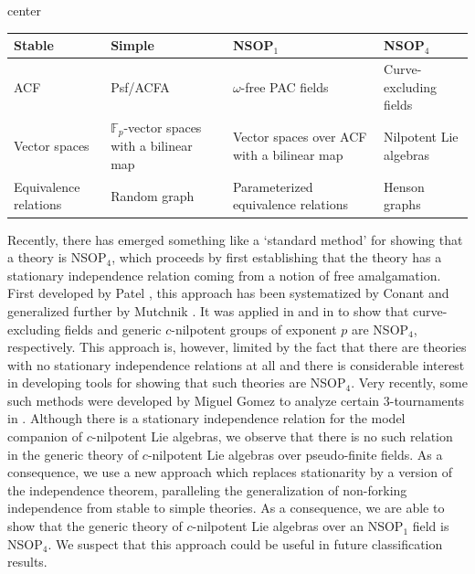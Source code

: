 \documentclass[psamsfonts]{amsart}
\theoremstyle{definition}
\theoremstyle{definition}
\theoremstyle{remark}
\numberwithin{equation}{section}
\begin{document}
\small{
\begin{table}[htbp]
  \centering
  \label{tab:my-table}
  \begin{adjustbox}{center}
  \begin{tabularx}{\textwidth}{|X|X|X|X|}
  \hline
    Stable & Simple & NSOP$_{1}$ & NSOP$_{4}$ \\
    \hline
    ACF & Psf/ACFA & $\omega$-free PAC fields & Curve-excluding fields \\
    \hline
     Vector spaces & $\mathbb{F}_{p}$-vector spaces with a bilinear map & Vector spaces over ACF with a bilinear map & Nilpotent Lie algebras \\
    \hline 
    Equivalence relations & Random graph & Parameterized equivalence relations & Henson graphs  \\
    \hline 
  \end{tabularx}
  \end{adjustbox}
\end{table}
}
\normalsize
\noindent Recently, there has emerged something like a `standard method' for showing that a theory is NSOP$_{4}$, which proceeds by first establishing that the theory has a stationary independence relation coming from a notion of free amalgamation.  First developed by Patel \cite{patel2006family}, this approach has been systematized by Conant \cite{conant2017axiomatic} and generalized further by Mutchnik \cite{mutchnik2022conant}.  It was applied in \cite{johnson2023curve} and in \cite{d2023model} to show that curve-excluding fields and generic $c$-nilpotent groups of exponent $p$ are NSOP$_{4}$, respectively.  This approach is, however, limited by the fact that there are theories with no stationary independence relations at all and there is considerable interest in developing tools for showing that such theories are NSOP$_{4}$.  Very recently, some such methods were developed by Miguel Gomez to analyze certain $3$-tournaments in \cite{miguel2024classification}.  Although there is a stationary independence relation for the model companion of $c$-nilpotent Lie algebras, we observe that there is no such relation in the generic theory of $c$-nilpotent Lie algebras over pseudo-finite fields. As a consequence, we use a new approach which replaces stationarity by a version of the independence theorem, paralleling the generalization of non-forking independence from stable to simple theories. As a consequence, we are able to show that the generic theory of $c$-nilpotent Lie algebras over an NSOP$_{1}$ field is NSOP$_4$.  We suspect that this approach could be useful in future classification results. 
\end{document}
